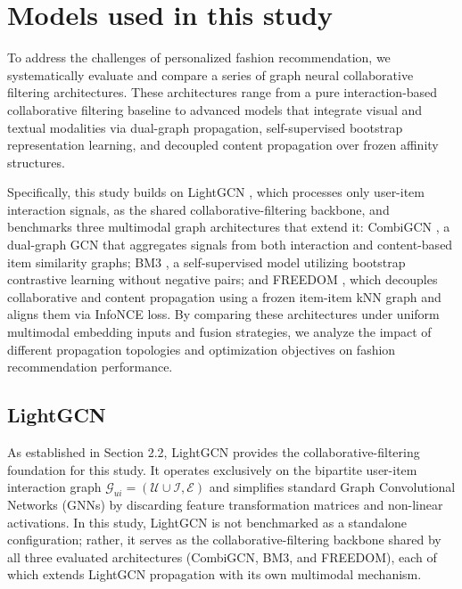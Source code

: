 \section{Models used in this study}

To address the challenges of personalized fashion recommendation, we systematically evaluate and compare a series of graph neural collaborative filtering architectures. These architectures range from a pure interaction-based collaborative filtering baseline to advanced models that integrate visual and textual modalities via dual-graph propagation, self-supervised bootstrap representation learning, and decoupled content propagation over frozen affinity structures. 

Specifically, this study builds on LightGCN \parencite{he2020lightgcnsimplifyingpoweringgraph}, which processes only user-item interaction signals, as the shared collaborative-filtering backbone, and benchmarks three multimodal graph architectures that extend it: CombiGCN \parencite{10.1007/978-981-97-0669-3_11}, a dual-graph GCN that aggregates signals from both interaction and content-based item similarity graphs; BM3 \parencite{10.1145/3543507.3583251}, a self-supervised model utilizing bootstrap contrastive learning without negative pairs; and FREEDOM \parencite{Zhou_2023}, which decouples collaborative and content propagation using a frozen item-item kNN graph and aligns them via InfoNCE loss. By comparing these architectures under uniform multimodal embedding inputs and fusion strategies, we analyze the impact of different propagation topologies and optimization objectives on fashion recommendation performance.

\subsection{LightGCN}

As established in Section 2.2, LightGCN \parencite{he2020lightgcnsimplifyingpoweringgraph} provides the collaborative-filtering foundation for this study. It operates exclusively on the bipartite user-item interaction graph $\mathcal{G}_{ui} = (\mathcal{U} \cup \mathcal{I}, \mathcal{E})$ and simplifies standard Graph Convolutional Networks (GNNs) by discarding feature transformation matrices and non-linear activations. In this study, LightGCN is not benchmarked as a standalone configuration; rather, it serves as the collaborative-filtering backbone shared by all three evaluated architectures (CombiGCN, BM3, and FREEDOM), each of which extends LightGCN propagation with its own multimodal mechanism.

